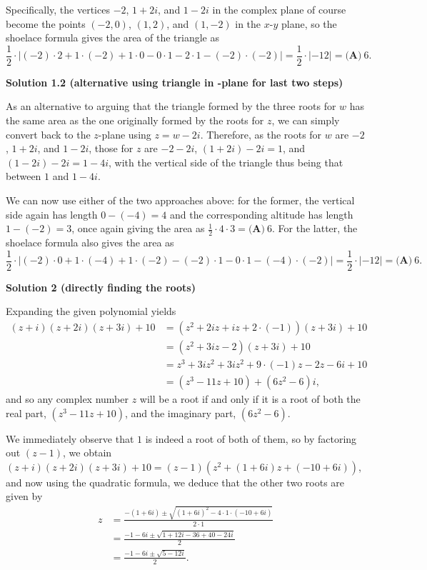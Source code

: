 \begin{enumerate}
 Specifically, the vertices $-2$, $1+2i$, and $1-2i$ in the complex plane of course become the points $(-2,0)$, $(1,2)$, and $(1,-2)$ in the $x$-$y$ plane, so the shoelace formula gives the area of the triangle as 
 \[\frac{1}{2} \cdot \left\lvert (-2) \cdot 2 + 1 \cdot (-2) + 1 \cdot 0 - 0 \cdot 1 - 2 \cdot 1 - (-2) \cdot (-2)\right\rvert = \frac{1}{2} \cdot \left\lvert -12\right\rvert = \boxed{\textbf{(A)}~6}.\]




\textbf{Solution 1.2 (alternative using triangle in -plane for last two steps)}

As an alternative to arguing that the triangle formed by the three roots for $w$ has the same area as the one originally formed by the roots for $z$, we can simply convert back to the $z$-plane using $z = w-2i$. Therefore, as the roots for $w$ are $-2$, $1+2i$, and $1-2i$, those for $z$ are $-2-2i$, $(1+2i)-2i = 1$, and $(1-2i)-2i = 1-4i$, with the vertical side of the triangle thus being that between $1$ and $1-4i$.

 We can now use either of the two approaches above: for the former, the vertical side again has length $0-(-4) = 4$ and the corresponding altitude has length $1-(-2) = 3$, once again giving the area as $\frac{1}{2} \cdot 4 \cdot 3 = \boxed{\textbf{(A)}~6}$. For the latter, the shoelace formula also gives the area as 
 \[\frac{1}{2} \cdot \left\lvert (-2) \cdot 0 + 1 \cdot (-4) + 1 \cdot (-2) - (-2) \cdot 1 - 0 \cdot 1 - (-4) \cdot (-2)\right\rvert = \frac{1}{2} \cdot \left\lvert -12\right\rvert = \boxed{\textbf{(A)}~6}.\]




\textbf{Solution 2 (directly finding the roots)}

Expanding the given polynomial yields 
 \begin{align*}(z+i)(z+2i)(z+3i)+10 &= \left(z^2 + 2iz + iz + 2 \cdot (-1)\right)\left(z+3i\right)+10 \\ &= \left(z^2+3iz-2\right)\left(z+3i\right)+10 \\ &= z^3 + 3iz^2 + 3iz^2 + 9 \cdot (-1)z - 2z - 6i + 10 \\ &= \left(z^3-11z+10\right)+\left(6z^2-6\right)i,\end{align*}
 and so any complex number $z$ will be a root if and only if it is a root of both the real part, $\left(z^3-11z+10\right)$, and the imaginary part, $\left(6z^2-6\right)$.

 We immediately observe that $1$ is indeed a root of both of them, so by factoring out $(z-1)$, we obtain $(z+i)(z+2i)(z+3i)+10 = \left(z-1\right)\left(z^2+(1+6i)z+(-10+6i)\right)$, and now using the quadratic formula, we deduce that the other two roots are given by 
 \begin{align*}z &= \frac{-(1+6i) \pm \sqrt{(1+6i)^2 - 4 \cdot 1 \cdot (-10+6i)}}{2 \cdot 1} \\ &= \frac{-1-6i \pm \sqrt{1+12i-36+40-24i}}{2} \\ &= \frac{-1-6i \pm \sqrt{5-12i}}{2}.\end{align*}



\end{enumerate}
